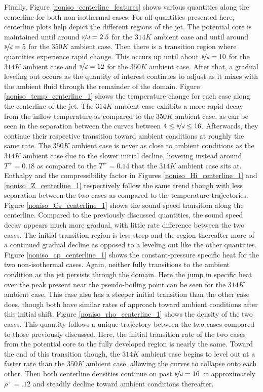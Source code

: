 Finally, Figure \ref{noniso_centerline_features} shows various quantities along the centerline for both non-isothermal cases. For all quantities presented here, centerline plots help depict the different regions of the jet. The potential core is maintained until around $\nicefrac{y}{d} = 2.5$ for the $314 K$ ambient case and until around $\nicefrac{y}{d}= 5$ for the $350 K$ ambient case. Then there is a transition region where quantities experience rapid change. This occurs up until about $\nicefrac{y}{d}= 10$ for the $314 K$ ambient case and $\nicefrac{y}{d} = 12$ for the $350 K$ ambient case. After that, a gradual leveling out occurs as the quantity of interest continues to adjust as it mixes with the ambient fluid through the remainder of the domain. Figure \ref{noniso_temp_centerline_1} shows the temperature change for each case along the centerline of the jet. The $314 K$ ambient case exhibits a more rapid decay from the inflow temperature as compared to the $350 K$ ambient case, as can be seen in the separation between the curves between $4 \leq \nicefrac{y}{d} \leq 16$. Afterwards, they continue their respective transition toward ambient conditions at roughly the same rate. The $350 K$ ambient case is never as close to ambient conditions as the $314 K$ ambient case due to the slower initial decline, hovering instead around $T^+=0.18$ as compared to the $T^+=0.14$ that the $314 K$ ambient case sits at. Enthalpy and the compressibility factor in Figures \ref{noniso_Hi_centerline_1} and \ref{noniso_Z_centerline_1} respectively follow the same trend though with less separation between the two cases as compared to the temperature trajectories. Figure \ref{noniso_Cs_centerline_1} shows the sound speed transition along the centerline. Compared to the previously discussed quantities, the sound speed decay appears much more gradual, with little rate difference between the two cases. The initial transition region is less steep and the region thereafter more of a continued gradual decline as opposed to a leveling out like the other quantities. Figure \ref{noniso_cp_centerline_1} shows the constant-pressure specific heat for the two non-isothermal cases. Again, neither fully transitions to the ambient condition as the jet persists through the domain. Here the jump in specific heat over the peak present near the pseudo-boiling point can be seen for the $314 K$ ambient case. This case also has a steeper initial transition than the other case does, though both have similar rates of approach toward ambient conditions after this initial shift. Figure \ref{noniso_rho_centerline_1} shows the density of the two cases. This quantity follows a unique trajectory between the two cases compared to those previously discussed. Here, the initial transition rate of the two cases from the potential core to the fully developed region is nearly the same. Toward the end of this transition though,  the $314 K$ ambient case begins to level out at a faster rate than the $350 K$ ambient case, allowing the curves to collapse onto each other. Then both centerline densities continue on past $\nicefrac{y}{d} = 16$ at approximately $\rho^+ = .12$ and steadily decline toward ambient conditions thereafter. 
